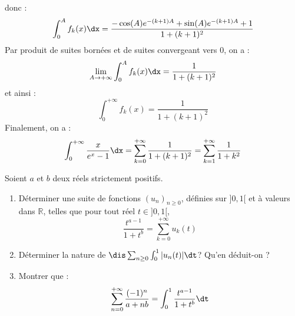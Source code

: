 \documentclass[a4paper,10pt]{report}
\begin{document}
donc :
$$\int_0^A f_k(x) \dx = \dfrac{-\cos(A)e^{-(k+1)A}+ \sin(A)e^{-(k+1)A}+1}{1+(k+1)^2}$$
Par produit de suites bornées et de suites convergeant vers $0$, on a :
$$ \lim_{A \rightarrow + \infty} \int_0^A f_k(x) \dx = \dfrac{1}{1+(k+1)^2}$$
et ainsi :
$$ \int_0^{+ \infty} f_k(x)  = \dfrac{1}{1+(k+1)^2}$$
Finalement, on a :
$$ \int_0^{+ \infty} \dfrac{x}{e^x-1} \dx = \sum_{k=0}^{+ \infty} \dfrac{1}{1+(k+1)^2} =  \sum_{k=1}^{+ \infty} \dfrac{1}{1+k^2}$$

\begin{Exa} Soient $a$ et $b$ deux réels strictement positifs.
\begin{enumerate}
\item Déterminer une suite de fonctions $(u_n)_{n \geq 0}$, définies sur $]0,1[$ et à valeurs dans $\mathbb{R}$, telles que pour tout réel $t \in ]0,1[$,
$$ \dfrac{t^{a-1}}{1+t^b} = \sum_{k=0}^{+ \infty} u_k(t)$$
\item Déterminer la nature de $\dis \sum_{n \geq 0} \int_0^1 \vert u_n(t) \vert \dt$? Qu'en déduit-on ?
\item Montrer que :
$$ \sum_{n=0}^{+ \infty} \dfrac{(-1)^n}{a+nb} = \int_0^1 \dfrac{t^{a-1}}{1+t^b} \dt$$
\end{enumerate}
\end{Exa}

\corr 
\end{document}

